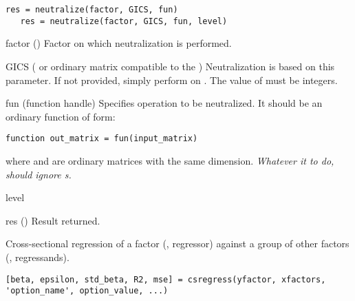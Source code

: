 \usage
   \begin{lstlisting}[numbers=none]
   res = neutralize(factor, GICS, fun)
   res = neutralize(factor, GICS, fun, level)
   \end{lstlisting}

\inarg
   \begin{argdesc}
      \item[factor] (\myfints{}) Factor on which neutralization is performed.
      \item[GICS]   (\myfints{} or ordinary matrix compatible to the )
                    Neutralization is based on this parameter. 
                    If not provided,  simply perform  on .
                    The value of  must be integers.

      \item[fun]    (function handle) Specifies operation to be neutralized.
                    It should be an ordinary \matlab{} function of form:
   \begin{lstlisting}[numbers=none]
         function out_matrix = fun(input_matrix)
   \end{lstlisting}
                    where  and  are ordinary matrices with the
                    same dimension. 
                    \emph{Whatever it to do,  should ignore s.}
       \item[level] 
   \end{argdesc}

\outarg
   \begin{argdesc}
      \item [res]  (\myfints{}) Result returned.
   \end{argdesc}

   Cross-sectional regression of a factor (, regressor) against a group of other factors
  (, regressands).

\usage
   \begin{lstlisting}[numbers=none]
   [beta, epsilon, std_beta, R2, mse] = csregress(yfactor, xfactors, 'option_name', option_value, ...)
   \end{lstlisting}

